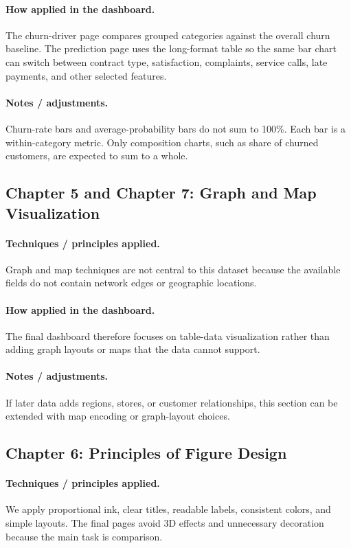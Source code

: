 \paragraph{How applied in the dashboard.}
The churn-driver page compares grouped categories against the overall churn
baseline. The prediction page uses the long-format  table so
the same bar chart can switch between contract type, satisfaction, complaints,
service calls, late payments, and other selected features.

\paragraph{Notes / adjustments.}
Churn-rate bars and average-probability bars do not sum to 100\%. Each bar is a
within-category metric. Only composition charts, such as share of churned
customers, are expected to sum to a whole.

\subsection{Chapter 5 and Chapter 7: Graph and Map Visualization}
\paragraph{Techniques / principles applied.}
Graph and map techniques are not central to this dataset because the available
fields do not contain network edges or geographic locations.

\paragraph{How applied in the dashboard.}
The final dashboard therefore focuses on table-data visualization rather than
adding graph layouts or maps that the data cannot support.

\paragraph{Notes / adjustments.}
If later data adds regions, stores, or customer relationships, this section can
be extended with map encoding or graph-layout choices.

\subsection{Chapter 6: Principles of Figure Design}
\paragraph{Techniques / principles applied.}
We apply proportional ink, clear titles, readable labels, consistent colors, and
simple layouts. The final pages avoid 3D effects and unnecessary decoration
because the main task is comparison.


